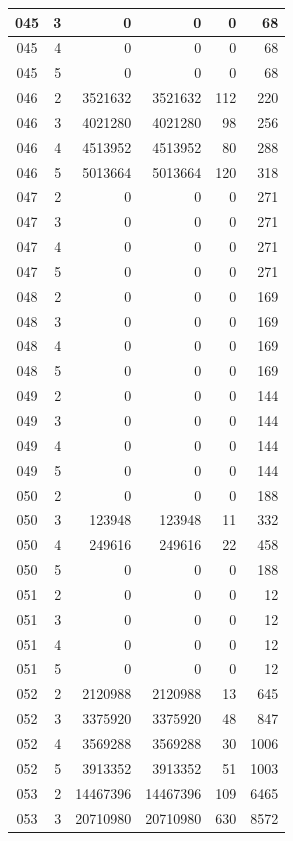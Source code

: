 \begin{longtable}{|c|r|r|r|r|r|}
\hline
045 & 3 & 0 & 0 & 0 & 68 \\
\hline
045 & 4 & 0 & 0 & 0 & 68 \\
\hline
045 & 5 & 0 & 0 & 0 & 68 \\
\hline
046 & 2 & 3521632 & 3521632 & 112 & 220 \\
\hline
046 & 3 & 4021280 & 4021280 & 98 & 256 \\
\hline
046 & 4 & 4513952 & 4513952 & 80 & 288 \\
\hline
046 & 5 & 5013664 & 5013664 & 120 & 318 \\
\hline
047 & 2 & 0 & 0 & 0 & 271 \\
\hline
047 & 3 & 0 & 0 & 0 & 271 \\
\hline
047 & 4 & 0 & 0 & 0 & 271 \\
\hline
047 & 5 & 0 & 0 & 0 & 271 \\
\hline
048 & 2 & 0 & 0 & 0 & 169 \\
\hline
048 & 3 & 0 & 0 & 0 & 169 \\
\hline
048 & 4 & 0 & 0 & 0 & 169 \\
\hline
048 & 5 & 0 & 0 & 0 & 169 \\
\hline
049 & 2 & 0 & 0 & 0 & 144 \\
\hline
049 & 3 & 0 & 0 & 0 & 144 \\
\hline
049 & 4 & 0 & 0 & 0 & 144 \\
\hline
049 & 5 & 0 & 0 & 0 & 144 \\
\hline
050 & 2 & 0 & 0 & 0 & 188 \\
\hline
050 & 3 & 123948 & 123948 & 11 & 332 \\
\hline
050 & 4 & 249616 & 249616 & 22 & 458 \\
\hline
050 & 5 & 0 & 0 & 0 & 188 \\
\hline
051 & 2 & 0 & 0 & 0 & 12 \\
\hline
051 & 3 & 0 & 0 & 0 & 12 \\
\hline
051 & 4 & 0 & 0 & 0 & 12 \\
\hline
051 & 5 & 0 & 0 & 0 & 12 \\
\hline
052 & 2 & 2120988 & 2120988 & 13 & 645 \\
\hline
052 & 3 & 3375920 & 3375920 & 48 & 847 \\
\hline
052 & 4 & 3569288 & 3569288 & 30 & 1006 \\
\hline
052 & 5 & 3913352 & 3913352 & 51 & 1003 \\
\hline
053 & 2 & 14467396 & 14467396 & 109 & 6465 \\
\hline
053 & 3 & 20710980 & 20710980 & 630 & 8572 \\

\end{longtable}
